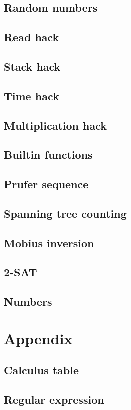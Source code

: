 \documentclass[titlepage, a4paper,10pt]{article}
\begin{document}
\begin{multicols}{2}
\begin{spacing}{0.6}
{			\subsection{Random numbers}
				
			\subsection{Read hack}
				
			\subsection{Stack hack}
				
			\subsection{Time hack}
				
			\subsection{Multiplication hack}
				
			\subsection{Builtin functions}
				
			\subsection{Prufer sequence}
				
			\subsection{Spanning tree counting}
				
			\subsection{Mobius inversion}
				
			\subsection{2-SAT}
				
			\subsection{Numbers}
				
		\section{Appendix}
			\subsection{Calculus table}
				
				
			\subsection{Regular expression}
				
		}
		\end{spacing}
		\endgroup
	\end{multicols}
\end{document}
